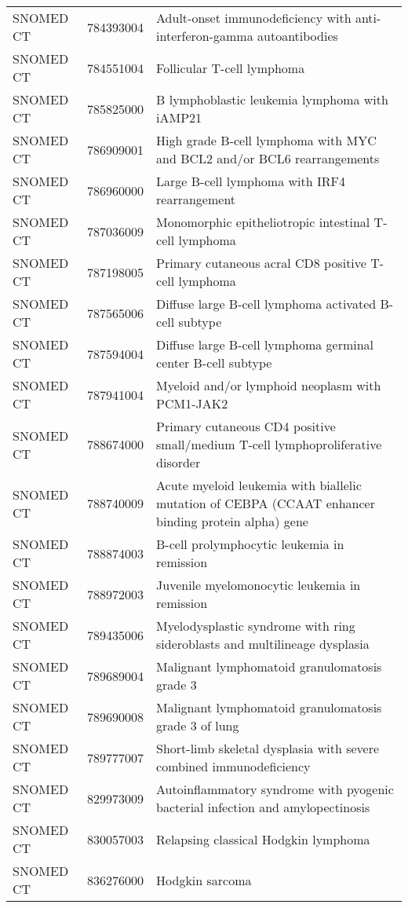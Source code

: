\begin{table}[ht]
\begin{tabular}{lll}
  SNOMED CT & 784393004 & Adult-onset immunodeficiency with anti-interferon-gamma autoantibodies \\ 
  SNOMED CT & 784551004 & Follicular T-cell lymphoma \\ 
  SNOMED CT & 785825000 & B lymphoblastic leukemia lymphoma with iAMP21 \\ 
  SNOMED CT & 786909001 & High grade B-cell lymphoma with MYC and BCL2 and/or BCL6 rearrangements \\ 
  SNOMED CT & 786960000 & Large B-cell lymphoma with IRF4 rearrangement \\ 
  SNOMED CT & 787036009 & Monomorphic epitheliotropic intestinal T-cell lymphoma \\ 
  SNOMED CT & 787198005 & Primary cutaneous acral CD8 positive T-cell lymphoma \\ 
  SNOMED CT & 787565006 & Diffuse large B-cell lymphoma activated B-cell subtype \\ 
  SNOMED CT & 787594004 & Diffuse large B-cell lymphoma germinal center B-cell subtype \\ 
  SNOMED CT & 787941004 & Myeloid and/or lymphoid neoplasm with PCM1-JAK2 \\ 
  SNOMED CT & 788674000 & Primary cutaneous CD4 positive small/medium T-cell lymphoproliferative disorder \\ 
  SNOMED CT & 788740009 & Acute myeloid leukemia with biallelic mutation of CEBPA (CCAAT enhancer binding protein alpha) gene \\ 
  SNOMED CT & 788874003 & B-cell prolymphocytic leukemia in remission \\ 
  SNOMED CT & 788972003 & Juvenile myelomonocytic leukemia in remission \\ 
  SNOMED CT & 789435006 & Myelodysplastic syndrome with ring sideroblasts and multilineage dysplasia \\ 
  SNOMED CT & 789689004 & Malignant lymphomatoid granulomatosis grade 3 \\ 
  SNOMED CT & 789690008 & Malignant lymphomatoid granulomatosis grade 3 of lung \\ 
  SNOMED CT & 789777007 & Short-limb skeletal dysplasia with severe combined immunodeficiency \\ 
  SNOMED CT & 829973009 & Autoinflammatory syndrome with pyogenic bacterial infection and amylopectinosis \\ 
  SNOMED CT & 830057003 & Relapsing classical Hodgkin lymphoma \\ 
  SNOMED CT & 836276000 & Hodgkin sarcoma \\ 

\end{tabular}
\end{table}
